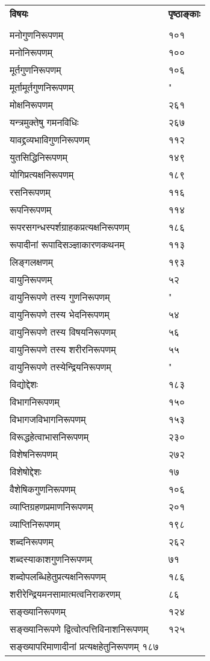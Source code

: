 \documentclass[11pt, openany]{book}
\begin{document}
\newpage
\noindent
\begin{tabular}{m{28em} m{2em}}
\textbf{विषयः} & \textbf{पृष्ठाङ्काः}\\
 & \\
 मनोगुणनिरूपणम् &१०१\\
मनोनिरूपणम् &१००\\
मूर्तगुणनिरूपणम् &१०६\\
मूर्तामूर्तगुणनिरूपणम् &"\\
मोक्षनिरूपणम् &२६१\\
यन्त्रमुक्तेषु गमनविधिः &२६७\\
यावद्द्रव्यभाविगुणनिरूपणम् &११२\\
युतसिद्धिनिरूपणम् &१४९\\
योगिप्रत्यक्षनिरूपणम् &१८९\\
रसनिरूपणम् &११६\\
रूपनिरूपणम् &११४\\
रूपरसगन्धस्पर्शग्राहकप्रत्यक्षनिरूपणम् &१८६\\
रूपादीनां रूपादिसञ्ज्ञाकारणकथनम् &११३\\
लिङ्गलक्षणम् &१९३\\
वायुनिरूपणम् &५२\\
वायुनिरूपणे तस्य गुणनिरूपणम् &"\\
वायुनिरूपणे तस्य भेदनिरूपणम् &५४\\
वायुनिरूपणे तस्य विषयनिरूपणम् &५६\\
वायुनिरूपणे तस्य शरीरनिरूपणम् &५५\\
वायुनिरूपणे तस्येन्द्रियनिरूपणम् &"\\
विद्योद्देशः &१८३\\
विभागनिरूपणम् &१५०\\
विभागजविभागनिरूपणम् &१५३\\
विरूद्धहेत्वाभासनिरूपणम् &२३०\\
विशेषनिरूपणम् &२७२\\
विशेषोद्देशः &१७\\
वैशेषिकगुणनिरूपणम् &१०६\\
व्याप्तिग्रहणप्रमाणनिरूपणम् &२०१\\
व्याप्तिनिरूपणम् &१९८\\
शब्दनिरूपणम् &२६२\\
शब्दस्याकाशगुणनिरूपणम् &७१\\
शब्दोपलब्धिहेतुप्रत्यक्षनिरूपणम् &१८६\\
शरीरेन्द्रियमनसामात्मत्वनिराकरणम् &८६\\
सङ्ख्यानिरूपणम् &१२४\\
सङ्ख्यानिरूपणे द्वित्वोत्पत्तिविनाशनिरूपणम् &१२५\\
सङ्ख्यापरिमाणादीनां प्रत्यक्षहेतुनिरूपणम् १८७
\end{tabular}
\end{document}
